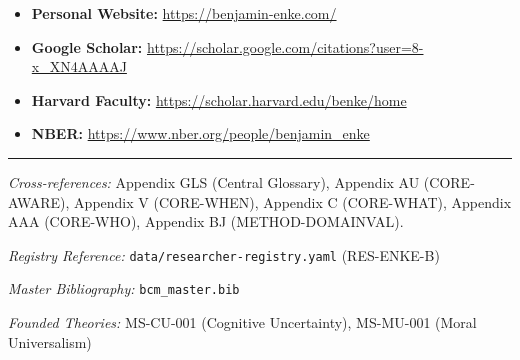 \begin{itemize}[nosep]
    \item \textbf{Personal Website:} \url{https://benjamin-enke.com/}
    \item \textbf{Google Scholar:} \url{https://scholar.google.com/citations?user=8-x_XN4AAAAJ}
    \item \textbf{Harvard Faculty:} \url{https://scholar.harvard.edu/benke/home}
    \item \textbf{NBER:} \url{https://www.nber.org/people/benjamin_enke}
\end{itemize}



\vspace{1em}
\hrule
\vspace{0.5em}

\noindent\textit{Cross-references:}
Appendix GLS (Central Glossary),
Appendix AU (CORE-AWARE),
Appendix V (CORE-WHEN),
Appendix C (CORE-WHAT),
Appendix AAA (CORE-WHO),
Appendix BJ (METHOD-DOMAINVAL).

\noindent\textit{Registry Reference:} \texttt{data/researcher-registry.yaml} (RES-ENKE-B)

\noindent\textit{Master Bibliography:} \texttt{bcm\_master.bib}

\noindent\textit{Founded Theories:} MS-CU-001 (Cognitive Uncertainty), MS-MU-001 (Moral Universalism)


